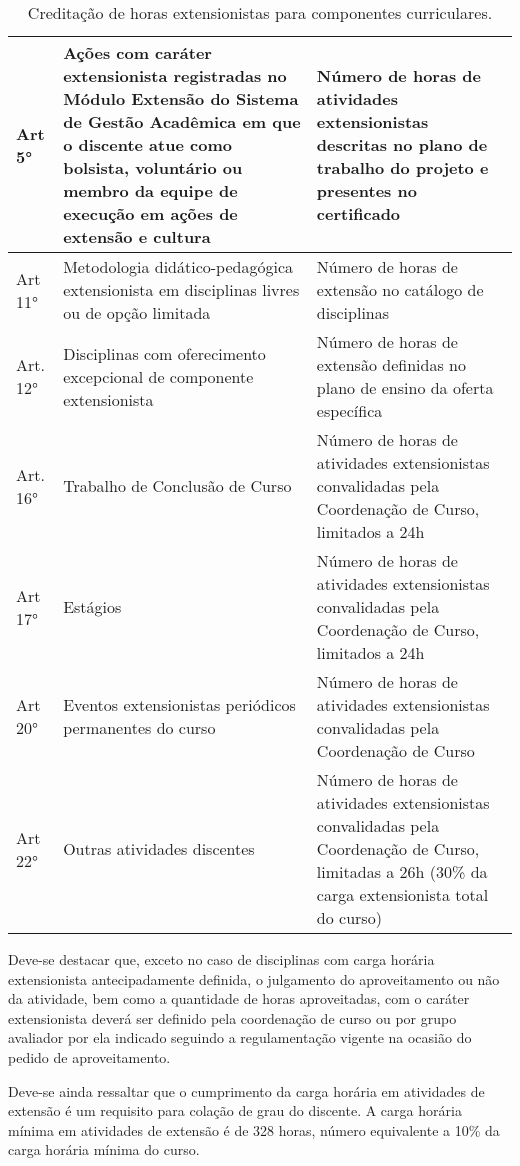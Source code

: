 \begin{table}[h!]
   \caption{Creditação de horas extensionistas para componentes curriculares.}
   \label{tab:componentes-ext}\centering
   \begin{tabular}{|p{}|p{}|p{}|}
      \hline
      Art 5°
      &
        Ações  com caráter  extensionista  registradas no  Módulo Extensão  do
        Sistema  de Gestão  Acadêmica em  que o  discente atue  como bolsista,
        voluntário ou  membro da  equipe de  execução em  ações de  extensão e
        cultura
      &
        Número de horas de atividades extensionistas descritas no plano de
        trabalho do projeto e presentes no certificado
      \\
      \hline
      Art 11°
      &
        Metodologia didático-pedagógica extensionista em disciplinas livres ou
        de opção limitada
      &
        Número de horas de extensão no catálogo de disciplinas
      \\
      \hline
      Art. 12°
      &
        Disciplinas com oferecimento excepcional de componente extensionista
      &
        Número de horas de extensão definidas no plano de ensino da oferta
        específica
     \\
           \hline
      Art. 16°
      &
        Trabalho de Conclusão de Curso
      &
        Número de horas de atividades extensionistas convalidadas pela
        Coordenação de Curso, limitados a 24h
      \\

      \hline
      Art 17°
      &
        Estágios
      &
        Número de horas de atividades extensionistas convalidadas pela
        Coordenação de Curso, limitados a 24h
      \\
      \hline
      Art 20°
      &
        Eventos extensionistas periódicos permanentes do curso
      &
        Número  de  horas  de   atividades  extensionistas  convalidadas  pela
        Coordenação de Curso
      \\
      \hline
      Art 22°
      &
        Outras atividades discentes
      &
        Número de horas de atividades extensionistas convalidadas pela
        Coordenação de Curso, limitadas a 26h (30\% da carga extensionista
        total do curso)
      \\
      \hline
    \end{tabular}
  \end{table}

Deve-se destacar que, exceto no caso de disciplinas com carga horária
extensionista antecipadamente definida, o julgamento do aproveitamento
ou não da atividade, bem como a quantidade de horas aproveitadas, com
o caráter extensionista deverá ser definido pela coordenação de curso
ou por grupo avaliador por ela indicado seguindo a regulamentação
vigente na ocasião do pedido de aproveitamento.

Deve-se ainda ressaltar que o cumprimento da carga horária em
atividades de extensão é um requisito para colação de grau do
discente. A carga horária mínima em atividades de extensão é de 328
horas, número equivalente a 10\% da carga horária mínima do curso.
